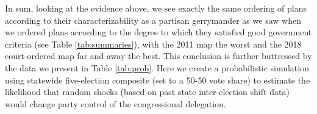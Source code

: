 \par
    In sum, looking at the evidence above, we see exactly the same ordering of plans according to their characterizability as a partisan gerrymander as we saw when we ordered plans according to the degree to which they satisfied good government criteria (see Table \ref{tab:summaries}), with the 2011 map the worst and the 2018 court-ordered map far and away the best. This conclusion is further buttressed by the data we present in Table \ref{tab:prob}. Here we create a probabilistic simulation using statewide five-election composite (set to a 50-50 vote share) to estimate the likelihood that random shocks (based on past state inter-election shift data) would change party control of the congressional delegation. 
\par
